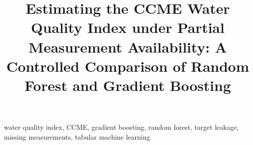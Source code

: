 \documentclass[conference]{IEEEtran}
\begin{document}
\title{Estimating the CCME Water Quality Index under Partial Measurement
Availability: A Controlled Comparison of Random Forest and Gradient Boosting}

\author{
}

\maketitle

\begin{abstract}

\end{abstract}

\begin{IEEEkeywords}
water quality index, CCME, gradient boosting, random forest, target leakage,
missing measurements, tabular machine learning
\end{IEEEkeywords}











\end{document}

